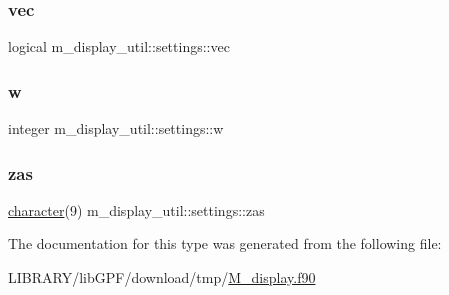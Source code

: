 \subsubsection{\texorpdfstring{vec}{vec}}
{\footnotesize\ttfamily logical m\+\_\+display\+\_\+util\+::settings\+::vec\hspace{0.3cm}{\ttfamily [private]}}

\mbox{\label{structm__display__util_1_1settings_a20dd8f6afcf787f415d678459d08e3a4}} 
\subsubsection{\texorpdfstring{w}{w}}
{\footnotesize\ttfamily integer m\+\_\+display\+\_\+util\+::settings\+::w\hspace{0.3cm}{\ttfamily [private]}}

\mbox{\label{structm__display__util_1_1settings_a2f91c5dcdbb75a1c307fff085d516abc}} 
\subsubsection{\texorpdfstring{zas}{zas}}
{\footnotesize\ttfamily \hyperlink{option__stopwatch_83_8txt_abd4b21fbbd175834027b5224bfe97e66}{character}(9) m\+\_\+display\+\_\+util\+::settings\+::zas\hspace{0.3cm}{\ttfamily [private]}}



The documentation for this type was generated from the following file\+:\begin{DoxyCompactItemize}
\item 
L\+I\+B\+R\+A\+R\+Y/lib\+G\+P\+F/download/tmp/\hyperlink{M__display_8f90}{M\+\_\+display.\+f90}\end{DoxyCompactItemize}
